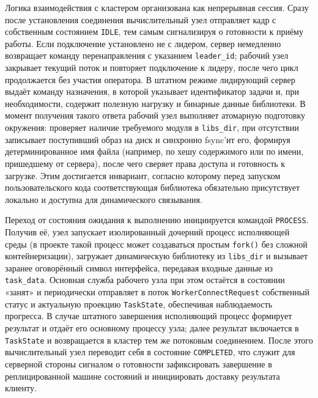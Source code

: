 Логика взаимодействия с кластером организована как непрерывная сессия. Сразу
после установления соединения вычислительный узел отправляет кадр с собственным
состоянием \texttt{IDLE}, тем самым сигнализируя о готовности к приёму работы.
Если подключение установлено не с лидером, сервер немедленно возвращает команду
перенаправления с указанием \texttt{leader\_id}; рабочий узел закрывает текущий поток
и повторяет подключение к лидеру, после чего цикл продолжается без участия
оператора. В штатном режиме лидирующий сервер выдаёт команду назначения, в
которой указывает идентификатор задачи и, при необходимости, содержит полезную
нагрузку и бинарные данные библиотеки. В момент получения такого ответа рабочий узел
выполняет атомарную подготовку окружения: проверяет наличие требуемого модуля в
\texttt{libs\_dir}, при отсутствии записывает поступивший образ на диск и
синхронно fsync’ит его, формируя детерминированное имя файла (например, по хешу
содержимого или по имени, пришедшему от сервера), после чего сверяет права
доступа и готовность к загрузке. Этим достигается инвариант, согласно которому
перед запуском пользовательского кода соответствующая библиотека обязательно
присутствует локально и доступна для динамического связывания.

Переход от состояния ожидания к выполнению инициируется командой
\texttt{PROCESS}. Получив её, узел запускает изолированный дочерний процесс
исполняющей среды (в проекте такой процесс может создаваться простым
\texttt{fork()} без сложной контейнеризации), загружает динамическую библиотеку
из \texttt{libs\_dir} и вызывает заранее оговорённый символ интерфейса,
передавая входные данные из \texttt{task\_data}. Основная служба рабочего узла при
этом остаётся в состоянии «занят» и периодически отправляет в поток
\texttt{WorkerConnectRequest} собственный статус и актуальную проекцию
\texttt{TaskState}, обеспечивая наблюдаемость прогресса. В случае штатного
завершения исполняющий процесс формирует результат и отдаёт его основному
процессу узла; далее результат включается в \texttt{TaskState} и возвращается в
кластер тем же потоковым соединением. После этого вычислительный узел переводит
себя в состояние \texttt{COMPLETED}, что служит для серверной стороны сигналом
о готовности зафиксировать завершение в реплицированной машине состояний и
инициировать доставку результата клиенту.

